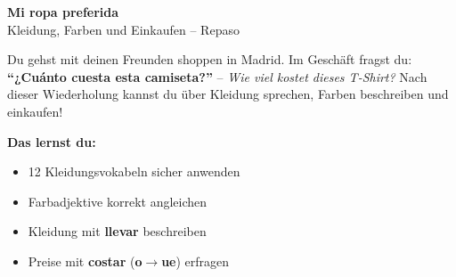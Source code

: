 \documentclass[10pt, a4paper]{article}
\newcommand{\seriftext}[1]{{\fontfamily{ppl}\selectfont #1}}
\newcommand{\thema}{Mi ropa preferida}
\newcommand{\untertitel}{Kleidung, Farben und Einkaufen}
\newcommand{\es}[1]{\seriftext{\textbf{#1}}}
\newcommand{\de}[1]{\textit{\textcolor{akzent}{#1}}}
\newcommand{\sw}[1]{\textcolor{stammwechsel}{\textbf{#1}}}
\begin{document}
\begin{center}
    {\large\bfseries\textcolor{spanisch}{\thema}}\\[2pt]
    {\small \untertitel{} -- Repaso}
\end{center}

\vspace{2pt}

{\small
Du gehst mit deinen Freunden shoppen in Madrid. Im Geschäft fragst du: \es{``¿Cuánto cuesta esta camiseta?''} -- \de{Wie viel kostet dieses T-Shirt?}
Nach dieser Wiederholung kannst du über Kleidung sprechen, Farben beschreiben und einkaufen!}

\vspace{3pt}

\begin{lernzielbox}
\small
\textbf{Das lernst du:}
\begin{itemize}[leftmargin=*, nosep, itemsep=1pt]
    \item 12 Kleidungsvokabeln sicher anwenden
    \item Farbadjektive korrekt angleichen
    \item Kleidung mit \es{llevar} beschreiben
    \item Preise mit \es{costar} (\sw{o$\rightarrow$ue}) erfragen
\end{itemize}
\end{lernzielbox}

\vspace{4pt}

\end{document}
